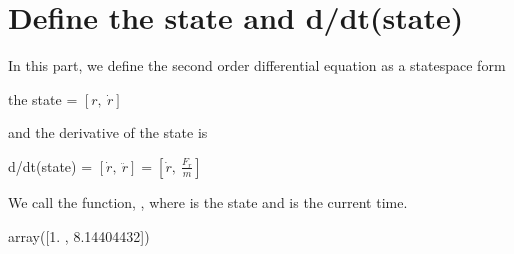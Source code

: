 \documentclass[letterpaper,10pt,english]{sphinxmanual}
\begin{document}
\noindent{}


\section{Define the state and d/dt(state)}
\label{\detokenize{module_04/yoyo-despin:define-the-state-and-d-dt-state}}
In this part, we define the second order differential equation as a state\sphinxhyphen{}space form

the state = \([r,~\dot{r}]\)

and the derivative of the state is

d/dt(state) = \([\dot{r},~\ddot{r}]=[\dot{r},~\frac{F_r}{m}]\)

We call the function, , where  is the state and  is the current time.

\begin{sphinxVerbatim}[commandchars=\\\{\}]
 
    \PYG{p}{[}\PYG{p}{]}\PYG{p}{[}\PYG{p}{]}
    \PYG{p}{[}\PYG{p}{]}\PYG{p}{[}\PYG{p}{]}\PYG{p}{[}\PYG{p}{]}
     
\end{sphinxVerbatim}

\begin{sphinxVerbatim}[commandchars=\\\{\}]
\PYG{p}{[}\PYG{p}{]}
\end{sphinxVerbatim}

\begin{sphinxVerbatim}[commandchars=\\\{\}]
array([1.        , 8.14404432])
\end{sphinxVerbatim}
\end{document}
